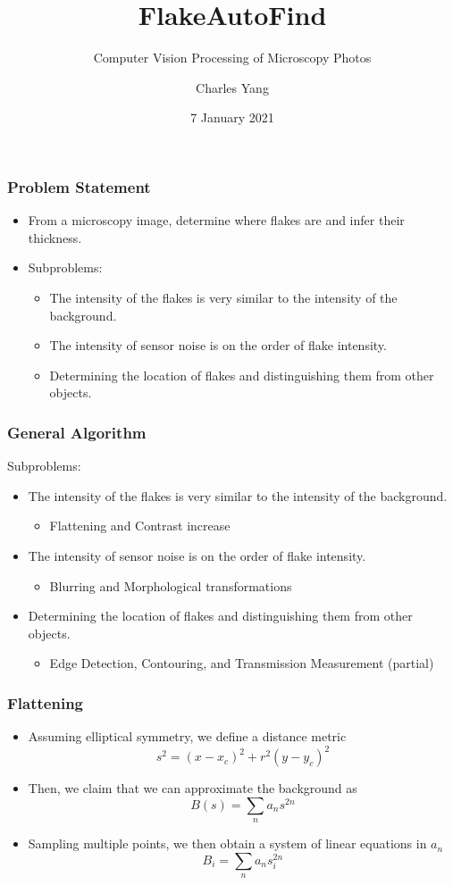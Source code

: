 \documentclass{beamer}
\title{FlakeAutoFind}
\subtitle{Computer Vision Processing of Microscopy Photos}
\author{Charles Yang}
\date{7 January 2021}
\begin{document}
\frame{\titlepage}

\begin{frame}
	\frametitle{Problem Statement}
	\begin{itemize}
		\item<1-> From a microscopy image, determine where flakes are and infer their thickness. 
		\item<2-> Subproblems:
		\begin{itemize}
			\item<2-> The intensity of the flakes is very similar to the intensity of the background.
			\item<3-> The intensity of sensor noise is on the order of flake intensity.
			\item<4-> Determining the location of flakes and distinguishing them from other objects.
		\end{itemize}
	\end{itemize}
\end{frame}

\begin{frame}
	\frametitle{General Algorithm}
		Subproblems:
		\begin{itemize}
			\item<1-> The intensity of the flakes is very similar to the intensity of the background.
				\begin{itemize}
					\item<2-> Flattening and Contrast increase
				\end{itemize}
			\item<1-> The intensity of sensor noise is on the order of flake intensity.
				\begin{itemize}
					\item<3-> Blurring and Morphological transformations
				\end{itemize}
			\item<1-> Determining the location of flakes and distinguishing them from other objects.
				\begin{itemize}
					\item<4-> Edge Detection, Contouring, and Transmission Measurement (partial)
				\end{itemize}
		\end{itemize}
\end{frame}

\begin{frame}
	\frametitle{Flattening}
	\begin{itemize}
		\item<1-> Assuming elliptical symmetry, we define a distance metric 
			\[s^2 = (x-x_c)^2+r^2(y-y_c)^2\]
		\item<2-> Then, we claim that we can approximate the background as
			\[B(s) = \sum_n a_n s^{2n}\]
		\item<3-> Sampling multiple points, we then obtain a system of linear equations in \(a_n\)
			\[B_i = \sum_n a_n s_i^{2n}\]
	\end{itemize}
\end{frame}
\end{document}
